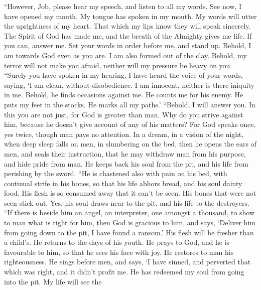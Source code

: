  ``However, Job, please hear my speech, and listen to all my
words.  See now, I have opened my mouth. My tongue has
spoken in my mouth.  My words will utter the uprightness of
my heart. That which my lips know they will speak sincerely.
 The Spirit of God has made me, and the breath of the
Almighty gives me life.  If you can, answer me. Set your
words in order before me, and stand up.  Behold, I am
towards God even as you are. I am also formed out of the clay.
 Behold, my terror will not make you afraid, neither will my
pressure be heavy on you.  ``Surely you have spoken in my
hearing, I have heard the voice of your words, saying,  `I
am clean, without disobedience. I am innocent, neither is there iniquity
in me.  Behold, he finds occasions against me. He counts me
for his enemy.  He puts my feet in the stocks. He marks all
my paths.'  ``Behold, I will answer you. In this you are
not just, for God is greater than man.  Why do you strive
against him, because he doesn't give account of any of his matters?
 For God speaks once, yes twice, though man pays no
attention.  In a dream, in a vision of the night, when deep
sleep falls on men, in slumbering on the bed,  then he
opens the ears of men, and seals their instruction,  that
he may withdraw man from his purpose, and hide pride from man.
 He keeps back his soul from the pit, and his life from
perishing by the sword.  ``He is chastened also with pain
on his bed, with continual strife in his bones,  so that
his life abhors bread, and his soul dainty food.  His flesh
is so consumed away that it can't be seen. His bones that were not seen
stick out.  Yes, his soul draws near to the pit, and his
life to the destroyers.  ``If there is beside him an angel,
an interpreter, one amongst a thousand, to show to man what is right for
him,  then God is gracious to him, and says, `Deliver him
from going down to the pit, I have found a ransom.'  His
flesh will be fresher than a child's. He returns to the days of his
youth.  He prays to God, and he is favourable to him, so
that he sees his face with joy. He restores to man his righteousness.
 He sings before men, and says, `I have sinned, and
perverted that which was right, and it didn't profit me. 
He has redeemed my soul from going into the pit. My life will see the
